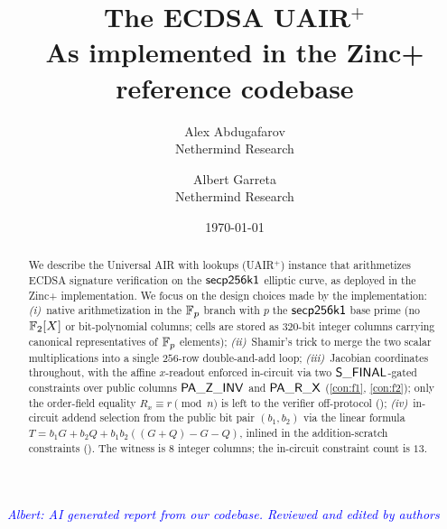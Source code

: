 \documentclass[11pt]{article}
\title{The ECDSA UAIR$^+$ \\
       \large As implemented in the Zinc+ reference codebase}
\author{Alex Abdugafarov \\[2pt] \normalsize Nethermind Research \and Albert Garreta \\[2pt] \normalsize Nethermind Research}
\date{\today}
\begin{document}
\maketitle

\begin{center}
\textcolor{blue}{\textit{Albert: AI generated report from our codebase. Reviewed and edited by authors}}
\end{center}
\vspace{0.5em}

\begin{abstract}
We describe the Universal AIR with lookups (UAIR$^+$) instance that
arithmetizes ECDSA signature verification on the $\mathsf{secp256k1}$ elliptic
curve, as deployed in the Zinc+  implementation. We focus
on the design choices made by the implementation:
\emph{(i)}~native arithmetization in the $\mathbb{F}_p$ branch with $p$ the
$\mathsf{secp256k1}$ base prime (no $\mathbb{F}_2[X]$ or bit-polynomial columns; cells
are stored as $320$-bit integer columns carrying canonical
representatives of $\mathbb{F}_p$ elements);
\emph{(ii)}~Shamir's trick to merge the two scalar multiplications
into a single $256$-row double-and-add loop;
\emph{(iii)}~Jacobian coordinates throughout, with the affine
$x$-readout enforced in-circuit via two $\mathsf{S\_FINAL}$-gated
constraints over public columns $\mathsf{PA\_Z\_INV}$ and $\mathsf{PA\_R\_X}$
(\ref{con:f1}, \ref{con:f2}); only the order-field equality
$R_x \equiv r \pmod n$ is left to the verifier off-protocol
();
\emph{(iv)}~in-circuit addend selection from the public bit pair
$(b_1, b_2)$ via the linear formula
$T = b_1 G + b_2 Q + b_1 b_2 ((G + Q) - G - Q)$, inlined in the
addition-scratch constraints ().
The witness is $8$ integer columns; the in-circuit constraint
count is $13$.
\end{abstract}

\tableofcontents





\end{document}
